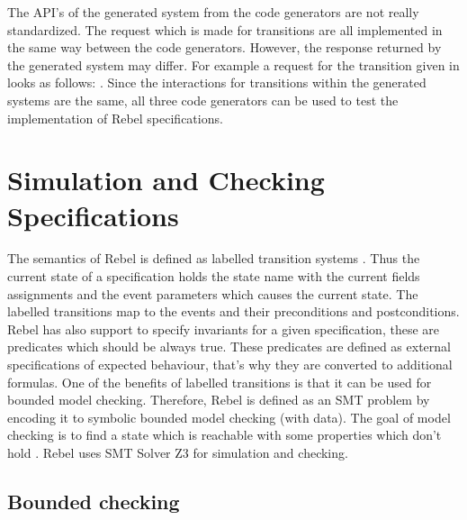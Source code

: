 The API's of the generated system from the code generators are not really standardized. The request which is made for transitions are all implemented in the same way between the code generators. However, the response returned by the generated system may differ.  For example a request for the transition given in \label{fig:account-openaccount-event} looks as follows: . Since the interactions for transitions within the generated systems are the same, all three code generators can be used to test the implementation of Rebel specifications.

\section{Simulation and Checking Specifications}


The semantics of Rebel is defined as labelled transition systems \cite[p.5]{stoel_storm_vinju_bosman_2016}. Thus the current state of a specification holds the state name with the current fields assignments and the event parameters which causes the current state. The labelled transitions map to the events and their preconditions and postconditions. Rebel has also support to specify invariants for a given specification, these are predicates which should be always true. These predicates are defined as external specifications of expected behaviour, that's why they are converted to additional formulas.  One of the benefits of labelled transitions is that it can be used for bounded model checking. Therefore, Rebel is defined as an SMT problem by encoding it to symbolic bounded model checking (with data). The goal of model checking is to find a state which is reachable with some properties which don't hold \cite[p.5]{stoel_storm_vinju_bosman_2016}. Rebel uses SMT Solver Z3 \cite{moura_bjorner_2008} for simulation and checking.

\subsection{Bounded checking}

